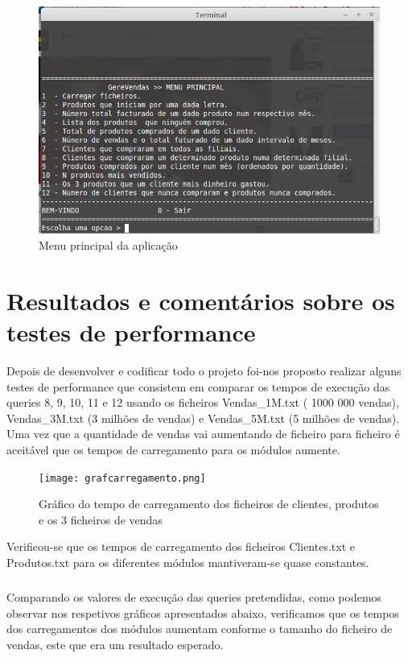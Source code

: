 \begin{figure}[h!]
	\centering
	\includegraphics[scale=0.6]{menu.png}  
	\caption{Menu principal da aplicação}  
\end{figure}


\chapter{Resultados e comentários sobre os testes de performance}
Depois de desenvolver e codificar todo o projeto foi-nos proposto realizar alguns testes de performance que consistem em comparar os tempos de execução das queries 8, 9, 10, 11 e 12 usando os ficheiros Vendas\_1M.txt ( 1000 000 vendas), Vendas\_3M.txt (3 milhões de vendas) e Vendas\_5M.txt (5 milhões de vendas).
Uma vez que a quantidade de vendas vai aumentando de ficheiro para ficheiro é aceitável que os tempos de carregamento para os módulos aumente.


\begin{figure}[h!]
	\centering
	\texttt{[image: grafcarregamento.png]}  
	\caption{Gráfico do tempo de carregamento dos ficheiros de clientes, produtos e os 3 ficheiros de vendas}  
\end{figure}

Verificou-se que os tempos de carregamento dos ficheiros Clientes.txt e Produtos.txt para os diferentes módulos mantiveram-se quase constantes. 

\paragraph{}
\paragraph{}
Comparando os valores de execução das queries pretendidas, como podemos observar nos respetivos gráficos apresentados abaixo, verificamos que os tempos dos carregamentos dos módulos aumentam conforme o tamanho do ficheiro de vendas, este que era um resultado esperado. 

